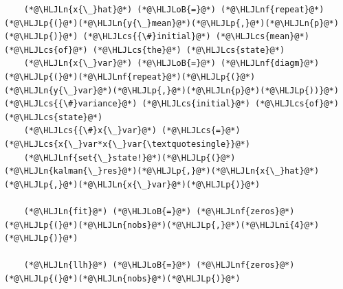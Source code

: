 \documentclass[12pt,a4paper]{article}
\newcommand{\HLJLn}[1]{#1}
\newcommand{\HLJLnf}[1]{\textcolor[RGB]{66,102,213}{#1}}
\newcommand{\HLJLni}[1]{\textcolor[RGB]{59,151,46}{#1}}
\newcommand{\HLJLoB}[1]{\textcolor[RGB]{102,102,102}{\textbf{#1}}}
\newcommand{\HLJLp}[1]{#1}
\newcommand{\HLJLcs}[1]{\textcolor[RGB]{153,153,119}{\textit{#1}}}
\begin{document}
\begin{lstlisting}
    (*@\HLJLn{x{\_}hat}@*) (*@\HLJLoB{=}@*) (*@\HLJLnf{repeat}@*)(*@\HLJLp{(}@*)(*@\HLJLn{y{\_}mean}@*)(*@\HLJLp{,}@*)(*@\HLJLn{p}@*)(*@\HLJLp{)}@*) (*@\HLJLcs{{\#}initial}@*) (*@\HLJLcs{mean}@*) (*@\HLJLcs{of}@*) (*@\HLJLcs{the}@*) (*@\HLJLcs{state}@*)
    (*@\HLJLn{x{\_}var}@*) (*@\HLJLoB{=}@*) (*@\HLJLnf{diagm}@*)(*@\HLJLp{(}@*)(*@\HLJLnf{repeat}@*)(*@\HLJLp{(}@*)(*@\HLJLn{y{\_}var}@*)(*@\HLJLp{,}@*)(*@\HLJLn{p}@*)(*@\HLJLp{))}@*)(*@\HLJLcs{{\#}variance}@*) (*@\HLJLcs{initial}@*) (*@\HLJLcs{of}@*) (*@\HLJLcs{state}@*)
    (*@\HLJLcs{{\#}x{\_}var}@*) (*@\HLJLcs{=}@*) (*@\HLJLcs{x{\_}var*x{\_}var{\textquotesingle}}@*)
    (*@\HLJLnf{set{\_}state!}@*)(*@\HLJLp{(}@*)(*@\HLJLn{kalman{\_}res}@*)(*@\HLJLp{,}@*)(*@\HLJLn{x{\_}hat}@*)(*@\HLJLp{,}@*)(*@\HLJLn{x{\_}var}@*)(*@\HLJLp{)}@*)

    (*@\HLJLn{fit}@*) (*@\HLJLoB{=}@*) (*@\HLJLnf{zeros}@*)(*@\HLJLp{(}@*)(*@\HLJLn{nobs}@*)(*@\HLJLp{,}@*)(*@\HLJLni{4}@*)(*@\HLJLp{)}@*)

    (*@\HLJLn{llh}@*) (*@\HLJLoB{=}@*) (*@\HLJLnf{zeros}@*)(*@\HLJLp{(}@*)(*@\HLJLn{nobs}@*)(*@\HLJLp{)}@*)


\end{lstlisting}
\end{document}
